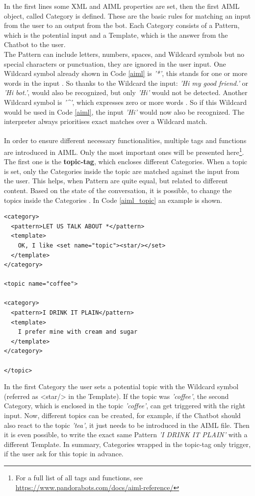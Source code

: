 \documentclass[10pt,final,journal,a4paper,oneside,twocolumn]{IEEEtran}
\begin{document}
In the first lines some XML and AIML properties are set, then the first AIML object, called Category is defined. These are the basic rules for matching an input from the user to an output from the bot. Each Category consists of a Pattern, which is the potential input and a Template, which is the answer from the Chatbot to the user.\\
The Pattern can include letters, numbers, spaces, and Wildcard symbols \cite{b21} but no special characters or punctuation, they are ignored in the user input. One Wildcard symbol already shown in Code \ref{aiml} is \textit{'*'}, this stands for one or more words in the input \cite{b20}. So thanks to the Wildcard the input: \textit{'Hi my good friend.'} or \textit{'Hi bot.'}, would also be recognized, but only \textit{'Hi'} would not be detected. Another Wildcard symbol is \textit{'\textasciicircum'}, which expresses zero or more words \cite{b20}. So if this Wildcard would be used in Code \ref{aiml}, the input \textit{'Hi'} would now also be recognized. The interpreter always prioritises exact matches over a Wildcard match.\\
\\
In order to ensure different necessary functionalities, multiple tags and functions are introduced in AIML. Only the most important ones will be presented here\footnote{For a full list of all tags and functions, see \href{https://www.pandorabots.com/docs/aiml-reference/}{https://www.pandorabots.com/docs/aiml-reference/}}. The first one is the \textbf{topic-tag}, which encloses different Categories. When a topic is set, only the Categories inside the topic are matched against the input from the user. This helps, when Pattern are quite equal, but related to different content. Based on the state of the conversation, it is possible, to change the topics inside the Categories \cite{b20}. In Code \ref{aiml_topic} an example is shown.
\begin{lstlisting}[caption={Example for the topic-tag (based on \cite{b20}).},label=aiml_topic,lineskip=1pt]
<category>
  <pattern>LET US TALK ABOUT *</pattern>
  <template>
    OK, I like <set name="topic"><star/></set>
  </template>
</category>

<topic name="coffee">

<category>
  <pattern>I DRINK IT PLAIN</pattern>
  <template>
    I prefer mine with cream and sugar
  </template>
</category>

</topic>
\end{lstlisting}
In the first Category the user sets a potential topic with the Wildcard symbol (referred as <star/> in the Template). If the topic was \textit{'coffee'}, the second Category, which is enclosed in the topic \textit{'coffee'}, can get triggered with the right input. Now, different topics can be created, for example, if the Chatbot should also react to the topic \textit{'tea'}, it just needs to be introduced in the AIML file. Then it is even possible, to write the exact same Pattern \textit{'I DRINK IT PLAIN'} with a different Template. In summary, Categories wrapped in the topic-tag only trigger, if the user ask for this topic in advance.\\
\end{document}
